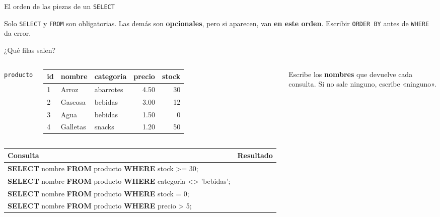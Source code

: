 \documentclass[aspectratio=169,10pt,c]{beamer}
\newcommand{\bl}[1][1.9cm]{\underline{\hspace{#1}}}
\newcommand{\tbl}[1]{\textcolor{utpNaranja}{\texttt{#1}}}
\newcommand{\kw}[1]{\textcolor{utpRojo}{\textbf{#1}}}
\newcommand{\ins}[1]{\tikz[baseline=-0.5ex]{\node[rounded corners=2pt,fill=utpRojo,text=white,
  font=\bfseries\scriptsize,inner xsep=5pt,inner ysep=2.5pt] {#1};}}
\newcommand{\pieza}[3]{%
  \node[pieza] at (0,#1) {#2};
  \node[para] at (8.6,#1) {\textcolor{utpRojo}{$\blacktriangleleft$}\ #3};}
\newcommand{\cabproducto}{%
  \normalfont\bfseries id & \normalfont\bfseries nombre & \normalfont\bfseries categoria
  & \normalfont\bfseries precio & \normalfont\bfseries stock \\}
\begin{document}
\begin{frame}{El orden de las piezas de un \texttt{SELECT}}
\begin{center}
\end{center}
\vspace{0.35cm}
\small Solo \texttt{SELECT} y \texttt{FROM} son obligatorias. Las demás son \textbf{opcionales}, pero si aparecen, van \textbf{en este orden}. Escribir \texttt{ORDER BY} antes de \texttt{WHERE} da error.
\end{frame}

\begin{frame}{\ins{Práctica 2} ¿Qué filas salen?}
\begin{columns}[c,onlytextwidth]
\centering\tbl{producto}\\[4pt]
\scriptsize\ttfamily
\begin{tabular}{lllrr}
\toprule
\cabproducto
\midrule
1 & Arroz & abarrotes & 4.50 & 30 \\
2 & Gaseosa & bebidas & 3.00 & 12 \\
3 & Agua & bebidas & 1.50 & 0 \\
4 & Galletas & snacks & 1.20 & 50 \\
\bottomrule
\end{tabular}
\small Escribe los \textbf{nombres} que devuelve cada consulta. Si no sale ninguno, escribe «ninguno».
\end{columns}
\vspace{0.4cm}
\begin{center}
\small
\begin{tabular}{>{\ttfamily\scriptsize}p{8.4cm}>{\raggedright\arraybackslash}p{3.4cm}}
\toprule
\normalfont\bfseries Consulta & \bfseries Resultado \\
\midrule
\kw{SELECT} nombre \kw{FROM} producto \kw{WHERE} stock >= 30; & \bl[3.1cm] \\[8pt]
\kw{SELECT} nombre \kw{FROM} producto \kw{WHERE} categoria <> 'bebidas'; & \bl[3.1cm] \\[8pt]
\kw{SELECT} nombre \kw{FROM} producto \kw{WHERE} stock = 0; & \bl[3.1cm] \\[8pt]
\kw{SELECT} nombre \kw{FROM} producto \kw{WHERE} precio > 5; & \bl[3.1cm] \\
\bottomrule
\end{tabular}
\end{center}
\end{frame}
\end{document}
